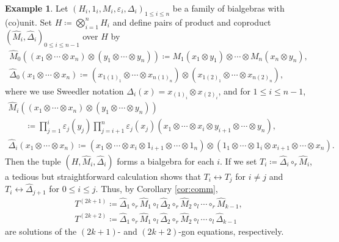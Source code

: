 \documentclass[10pt,a4paper]{amsart}
\numberwithin{equation}{section}
\theoremstyle{definition}
\newtheorem{Example}[Theorem]{Example}
\begin{document}
\begin{Example}
 Let $(H_i,1_i,M_i,\varepsilon_i,\Delta_i)_{1\leq i\leq n}$ be a family of bialgebras with (co)unit.
 Set $H \coloneqq \bigotimes_{i=1}^{n}H_i$ and define pairs of product and coproduct $(\widehat{M}_i,\widehat{\Delta}_i)_{0\leq i\leq n-1}$ over $H$ by
 \begin{gather*}
 \widehat{M}_0((x_1 \otimes \cdots \otimes x_n) \otimes (y_1 \otimes \cdots \otimes y_n)) \coloneqq
 M_1(x_1 \otimes y_1) \otimes \cdots \otimes M_n(x_n \otimes y_n),\\
 \widehat{\Delta}_0(x_1 \otimes \cdots \otimes x_n) \coloneqq (x_{1(1)_1} \otimes \cdots \otimes x_{n(1)_n}) \otimes (x_{1(2)_1} \otimes \cdots \otimes x_{n(2)_n}),
 \end{gather*}
 where we use Sweedler notation $\Delta_i(x)=x_{(1)_i}\otimes x_{(2)_i}$, and for $1 \leq i \leq n-1$,
 \begin{gather*}
 \widehat{M}_i((x_1 \otimes \cdots \otimes x_n) \otimes (y_1 \otimes \cdots \otimes y_n)) \\
 \qquad{} \coloneqq
 \prod_{j=1}^{i}\varepsilon_j(y_j)\prod_{j=i+1}^{n}\varepsilon_j(x_j)(x_1 \otimes \cdots \otimes x_i \otimes y_{i+1} \otimes \cdots \otimes y_n),\\
 \widehat{\Delta}_i(x_1 \otimes \cdots \otimes x_n) \coloneqq (x_1 \otimes \cdots \otimes x_i \otimes 1_{i+1} \otimes \cdots \otimes 1_{n}) \otimes (1_{1} \otimes \cdots \otimes 1_{i} \otimes x_{i+1} \otimes \cdots \otimes x_n).
 \end{gather*}
 Then the tuple $(H, \widehat{M}_i,\widehat{\Delta}_i)$ forms a bialgebra for each $i$.
 If we set $T_i\coloneqq\widehat{\Delta}_i \circ_r \widehat{M}_i$, a tedious but straightforward calculation shows that $T_i\leftrightarrow T_j$ for $i\neq j$ and $T_i\leftrightarrow \widehat{\Delta}_{j+1}$ for $0\leq i \leq j$.
 Thus, by Corollary \ref{cor:comm},
 \begin{gather*}
 T^{(2k+1)} \coloneqq \widehat{\Delta}_1 \circ_r \widehat{M}_1 \circ_l \widehat{\Delta}_2 \circ_r \widehat{M}_2 \circ_l \cdots \circ_{r} \widehat{M}_{k-1}, \\
 T^{(2k+2)} \coloneqq \widehat{\Delta}_1 \circ_r \widehat{M}_1 \circ_l \widehat{\Delta}_2 \circ_r \widehat{M}_2 \circ_l \cdots \circ_{l} \widehat{\Delta}_{k-1}
 \end{gather*}
 are solutions of the $(2k+1)$- and $(2k+2)$-gon equations, respectively.
\end{Example}
\end{document}

